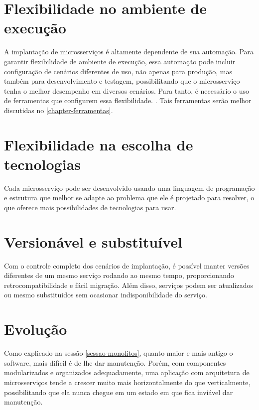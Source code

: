 \section{Flexibilidade no ambiente de execução}

A implantação de microsserviços é altamente dependente de sua automação. Para garantir flexibilidade de ambiente de execução, essa automação pode incluir configuração de cenários diferentes de uso, não apenas para produção, mas também para desenvolvimento e testagem, possibilitando que o microsserviço tenha o melhor desempenho em diversos cenários. Para tanto, é necessário o uso de ferramentas que configurem essa flexibilidade. \cite{Familiar2015}. Tais ferramentas serão melhor discutidas no \autoref{chapter-ferramentas}.

\section{Flexibilidade na escolha de tecnologias}

Cada microsserviço pode ser desenvolvido usando uma linguagem de programação e estrutura que melhor se adapte ao problema que ele é projetado para resolver, o que oferece mais possibilidades de tecnologias para usar. \cite{oracle_microservices}

\section{Versionável e substituível}

Com o controle completo dos cenários de implantação, é possível manter versões diferentes de um mesmo serviço rodando ao mesmo tempo, proporcionando retrocompatibilidade e fácil migração. Além disso, serviços podem ser atualizados ou mesmo substituidos sem ocasionar indisponibilidade do serviço. \cite{Familiar2015}

\section{Evolução}

Como explicado na sessão \autoref{sessao-monolitos}, quanto maior e mais antigo o software, mais difícil é de lhe dar manutenção. Porém, com componentes modularizados e organizados adequadamente, uma aplicação com arquitetura de microsserviços tende a crescer muito mais horizontalmente do que verticalmente, possibilitando que ela nunca chegue em um estado em que fica inviável dar manutenção. 

